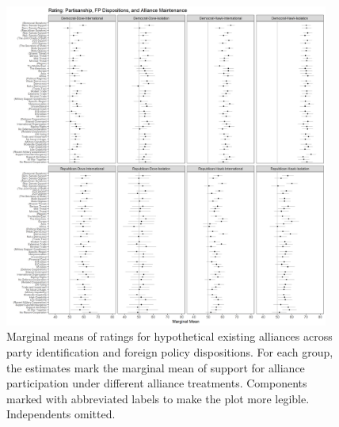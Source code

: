 \documentclass[12pt]{article}
\begin{document}
\begin{figure}
	\centering
		\includegraphics[width=0.95\textwidth]{party-dispo-mainapp.png}
	\caption{Marginal means of ratings for hypothetical existing alliances across party identification and foreign policy dispositions. For each group, the estimates mark the marginal mean of support for alliance participation under different alliance treatments. Components marked with abbreviated labels to make the plot more legible. Independents omitted.}
	\label{fig:party-dispo-main}
\end{figure}


\newpage 
\end{document}
